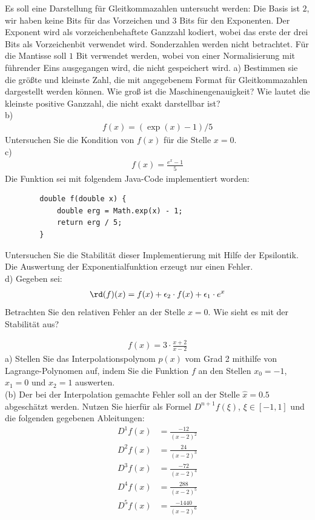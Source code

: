 \documentclass{scrartcl}
\begin{document}
	Es soll eine Darstellung für Gleitkommazahlen untersucht werden: Die Basis ist $2$, wir haben keine Bits für das Vorzeichen und $3$ Bits für den Exponenten. Der Exponent wird als vorzeichenbehaftete Ganzzahl kodiert, wobei das erste der drei Bits als Vorzeichenbit verwendet wird. Sonderzahlen werden nicht betrachtet. Für die Mantisse soll $1$ Bit verwendet werden, wobei von einer Normalisierung mit führender Eins ausgegangen wird, die nicht gespeichert wird.
	\n
	a) 
	Bestimmen sie die größte und kleinste Zahl, die mit angegebenem Format für Gleitkommazahlen dargestellt werden können. 
	\n
	Wie groß ist die Maschinengenauigkeit?
	\n 
	Wie lautet die kleinste positive Ganzzahl, die nicht exakt darstellbar ist?
	\lbreak \lbreak \lbreak \lbreak 
	\\
	b) 
	\begin{align*}
		f(x) = (\exp(x) - 1 ) / 5
	\end{align*}
	Untersuchen Sie die Kondition von $f(x)$ für die Stelle $x=0$.
	\lbreak \lbreak \lbreak \lbreak 
	\\
	c)
	\begin{align*}
		f(x) = \frac{e^x - 1}{5}
	\end{align*}
	Die Funktion sei mit folgendem Java-Code implementiert worden:
	\begin{lstlisting}
		double f(double x) {
			double erg = Math.exp(x) - 1;
			return erg / 5;
		}
	\end{lstlisting}
	Untersuchen Sie die Stabilität dieser Implementierung mit Hilfe der Epsilontik.
	 Die Auswertung der Exponentialfunktion erzeugt nur einen Fehler.
	\lbreak \lbreak \lbreak \lbreak 
	\\
	d)
	Gegeben sei:
	\begin{align*}
		\rd(f)(x) = f(x) + \epsilon_2 \cdot f(x) + \epsilon_1 \cdot e^x
	\end{align*}
	Betrachten Sie den relativen Fehler an der Stelle $x=0$. Wie sieht es mit der Stabilität aus?
	

	\begin{align*}
		f(x) = 3\cdot \frac{x + 2}{x - 2}
	\end{align*}
	a)
	Stellen Sie das Interpolationspolynom $p(x)$ vom Grad 2 mithilfe von Lagrange-Polynomen auf, indem Sie die Funktion $f$ an den Stellen $x_0 = -1$, $x_1 = 0$ und $x_2 = 1$ auswerten.
	\lbreak \lbreak \lbreak \lbreak
	\\
	(b)
	Der  bei der Interpolation gemachte Fehler soll an der Stelle $\hat{x} = 0.5$ abgeschätzt werden.
	\n 
	Nutzen Sie hierfür als Formel $D^{n+1} f(\xi)$, $\xi \in [-1, 1]$ und die folgenden gegebenen Ableitungen:
	\begin{align*}
		D^1f(x) &= \frac{-12}{(x-2)^2} \\
		D^2f(x) &= \frac{24}{(x-2)^3} \\
		D^3f(x) &= \frac{-72}{(x-2)^4} \\
		D^4f(x) &= \frac{288}{(x-2)^5} \\
		D^5f(x) &= \frac{-1440}{(x-2)^6} \\
	\end{align*}
\end{document}
